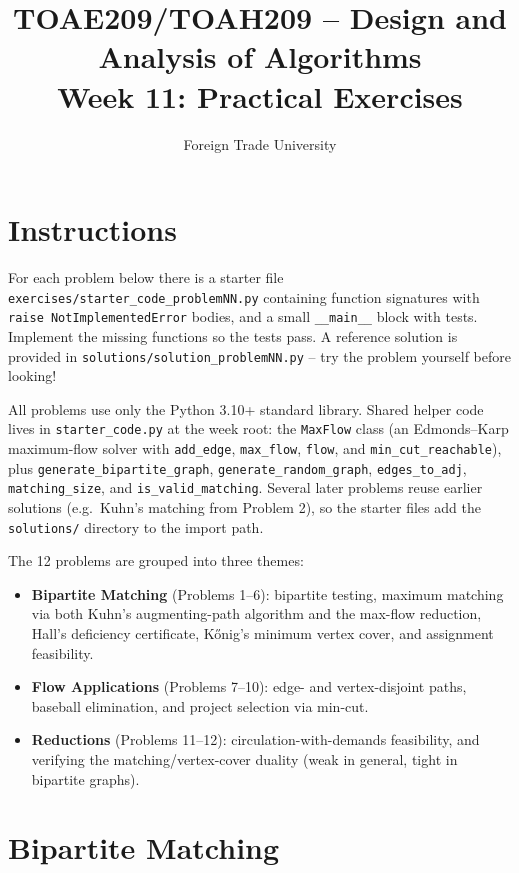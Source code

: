 \documentclass[11pt]{article}
\title{TOAE209/TOAH209 -- Design and Analysis of Algorithms\\[4pt]
\large Week 11: Practical Exercises}
\author{Foreign Trade University}
\date{}
\begin{document}
\maketitle

\section*{Instructions}

For each problem below there is a starter file
\texttt{exercises/starter\_code\_problemNN.py} containing function signatures with
\texttt{raise NotImplementedError} bodies, and a small \texttt{\_\_main\_\_} block with
tests. Implement the missing functions so the tests pass. A reference solution is
provided in \texttt{solutions/solution\_problemNN.py} -- try the problem yourself before
looking!

All problems use only the Python 3.10+ standard library. Shared helper code lives in
\texttt{starter\_code.py} at the week root: the \texttt{MaxFlow} class (an Edmonds--Karp
maximum-flow solver with \texttt{add\_edge}, \texttt{max\_flow}, \texttt{flow}, and
\texttt{min\_cut\_reachable}), plus \texttt{generate\_bipartite\_graph},
\texttt{generate\_random\_graph}, \texttt{edges\_to\_adj}, \texttt{matching\_size}, and
\texttt{is\_valid\_matching}. Several later problems reuse earlier solutions (e.g.\
Kuhn's matching from Problem 2), so the starter files add the \texttt{solutions/}
directory to the import path.

The 12 problems are grouped into three themes:
\begin{itemize}
    \item \textbf{Bipartite Matching} (Problems 1--6): bipartite testing,
    maximum matching via both Kuhn's augmenting-path algorithm and the max-flow
    reduction, Hall's deficiency certificate, K\H{o}nig's minimum vertex cover,
    and assignment feasibility.
    \item \textbf{Flow Applications} (Problems 7--10): edge- and vertex-disjoint
    paths, baseball elimination, and project selection via min-cut.
    \item \textbf{Reductions} (Problems 11--12): circulation-with-demands
    feasibility, and verifying the matching/vertex-cover duality (weak in general,
    tight in bipartite graphs).
\end{itemize}

\newpage
\section{Bipartite Matching}
\end{document}
